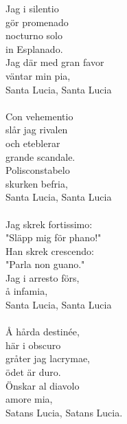 
Jag i silentio \\ gör promenado \\ nocturno solo \\ in Esplanado. \\ Jag där med gran favor \\ väntar min pia, \\ Santa Lucia, Santa Lucia \\ \hspace{10mm} \\ Con vehementio \\ slår jag rivalen \\ och eteblerar \\ grande scandale. \\ Polisconstabelo \\ skurken befria, \\ Santa Lucia, Santa Lucia \\ \hspace{10mm} \\ Jag skrek fortissimo: \\ "Släpp mig för phano!" \\ Han skrek crescendo: \\ "Parla non guano." \\ Jag i arresto förs, \\ å infamia, \\ Santa Lucia, Santa Lucia \\ \hspace{10mm} \\ Å hårda destinée, \\ här i obscuro \\ gråter jag lacrymae, \\ ödet är duro. \\ Önskar al diavolo \\ amore mia, \\ Satans Lucia, Satans Lucia.